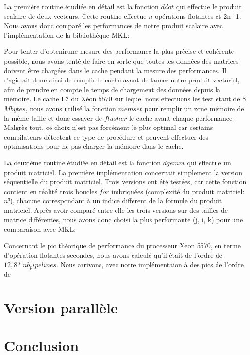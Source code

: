 \documentclass[a4paper,11pt]{article}
\begin{document}
La première routine étudiée en détail est la fonction $ddot$ qui effectue le produit scalaire de deux vecteurs. Cette routine effectue $n$ opérations flotantes et 2n+1. Nous avons donc comparé les performances de notre produit scalaire avec l'implémentation de la bibliothèque MKL:

Pour tenter d'obtenirune mesure des performance la plus précise et cohérente possible, nous avons tenté de faire en sorte que toutes les données des matrices doivent être chargées dans le cache pendant la mesure des performances. Il s'agissait donc ainsi de remplir le cache avant de lancer notre produit vectoriel, afin de prendre en compte le temps de chargement des données depuis la mémoire. Le cache L2 du Xéon 5570 sur lequel nous effectuons les test étant de 8 $Mbytes$, nous avons utilisé la fonction $memset$ pour remplir un zone mémoire de la même taille et donc essayer de $flusher$ le cache avant chaque performance. Malgrès tout, ce choix n'est pas forcément le plus optimal car certains compilateurs détectent ce type de procédure et peuvent effectuer des optimisations pour ne pas charger la mémoire dans le cache.


La deuxième routine étudiée en détail est la fonction $dgemm$ qui effectue un produit matriciel. La première implémentation concernait simplement la version séquentielle du produit matriciel. Trois versions ont été testées, car cette fonction contient en réalité trois boucles $for$ imbriquées (complexité du produit matriciel: $n³$), chacune correspondant à un indice different de la formule du produit matriciel. Après avoir comparé entre elle les trois versions sur des tailles de matrice différentes, nous avons donc choisi la plus performante (j, i, k) pour une comparaison avec MKL:


Concernant le pic théorique de performance du processeur Xeon 5570, en terme d'opération flotantes secondes, nous avons calculé qu'il était de l'ordre de $12,8 * nb_pipelines$. Nous arrivons, avec notre implémentaion à des pics de l'ordre de %

\section{Version parallèle}

\section{Conclusion}
\end{document}
